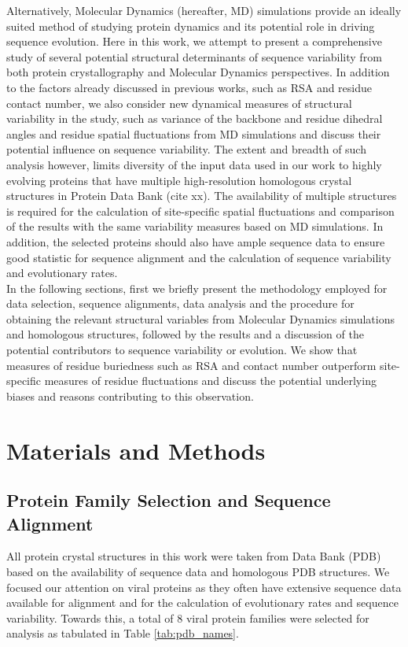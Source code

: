 \documentclass[preprint,12pt]{article}
\begin{document}
    Alternatively, Molecular Dynamics (hereafter, MD) simulations provide an ideally suited method of studying protein dynamics and its potential role in driving sequence evolution.  Here in this work, we attempt to present a comprehensive study of several potential structural determinants of sequence variability from both protein crystallography and Molecular Dynamics perspectives. In addition to the factors already discussed in previous works, such as RSA and residue contact number, we also consider new dynamical measures of structural variability in the study, such as variance of the backbone and residue dihedral angles and residue spatial fluctuations from MD simulations and discuss their potential influence on sequence variability. The extent and breadth of such analysis however, limits diversity of the input data used in our work to highly evolving proteins that have multiple high-resolution homologous crystal structures in Protein Data Bank (cite xx). The availability of multiple structures is required for the calculation of site-specific spatial fluctuations and comparison of the results with the same variability measures based on MD simulations. In addition, the selected proteins should also have ample sequence data to ensure good statistic for sequence alignment and the calculation of sequence variability and evolutionary rates. \\
	
    In the following sections, first we briefly present the methodology employed for data selection, sequence alignments, data analysis and the procedure for obtaining the relevant structural variables from Molecular Dynamics simulations and homologous structures, followed by the results and a discussion of the potential contributors to sequence variability or evolution. We show that measures of residue buriedness such as RSA and contact number outperform site-specific measures of residue fluctuations and discuss the potential underlying biases and reasons contributing to this observation.

\section{Materials and Methods}

	\subsection{Protein Family Selection and Sequence Alignment}
	
        All protein crystal structures in this work were taken from Data Bank (PDB) based on the availability of sequence data and homologous PDB structures. We focused our attention on viral proteins as they often have extensive sequence data available for alignment and for the calculation of evolutionary rates and sequence variability. Towards this, a total of $8$ viral protein families were selected for analysis as tabulated in Table \ref{tab:pdb_names}.
\end{document}
